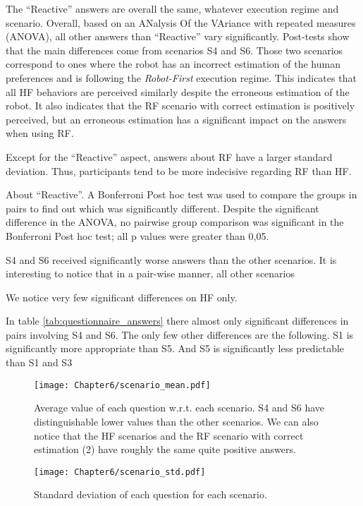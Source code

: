 The ``Reactive'' answers are overall the same, whatever execution regime and scenario. 
Overall, based on an ANalysis Of the VAriance with repeated measures (ANOVA), all other answers than ``Reactive'' vary significantly. Post-tests show that the main differences come from scenarios S4 and S6. Those two scenarios correspond to ones where the robot has an incorrect estimation of the human preferences and is following the \textit{Robot-First} execution regime. This indicates that all HF behaviors are perceived similarly despite the erroneous estimation of the robot. It also indicates that the RF scenario with correct estimation is positively perceived, but an erroneous estimation has a significant impact on the answers when using RF.  

Except for the ``Reactive'' aspect, answers about RF have a larger standard deviation. Thus, participants tend to be more indecisive regarding RF than HF.

About ``Reactive''. A Bonferroni Post hoc test was used to compare the groups in pairs to find out which was significantly different.
Despite the significant difference in the ANOVA, no pairwise group comparison was significant in the Bonferroni Post hoc test; all p values were greater than 0,05. 

S4 and S6 received significantly worse answers than the other scenarios. It is interesting to notice that in a pair-wise manner, all other scenarios 

We notice very few significant differences on HF only.

In table \ref{tab:questionnaire_answers} there almost only significant differences in pairs involving S4 and S6. The only few other differences are the following. 
S1 is significantly more appropriate than S5. And S5 is significantly less predictable than S1 and S3

\begin{figure}[h]
    \texttt{[image: Chapter6/scenario\_mean.pdf]}
    \caption{Average value of each question w.r.t. each scenario. S4 and S6 have distinguishable lower values than the other scenarios. We can also notice that the HF scenarios and the RF scenario with correct estimation (2) have roughly the same quite positive answers.}
    \label{fig:scenario_mean}
\end{figure}

\begin{figure}[h]
    \texttt{[image: Chapter6/scenario\_std.pdf]}
    \caption{Standard deviation of each question for each scenario.}
    \label{fig:scenario_std}
\end{figure}

